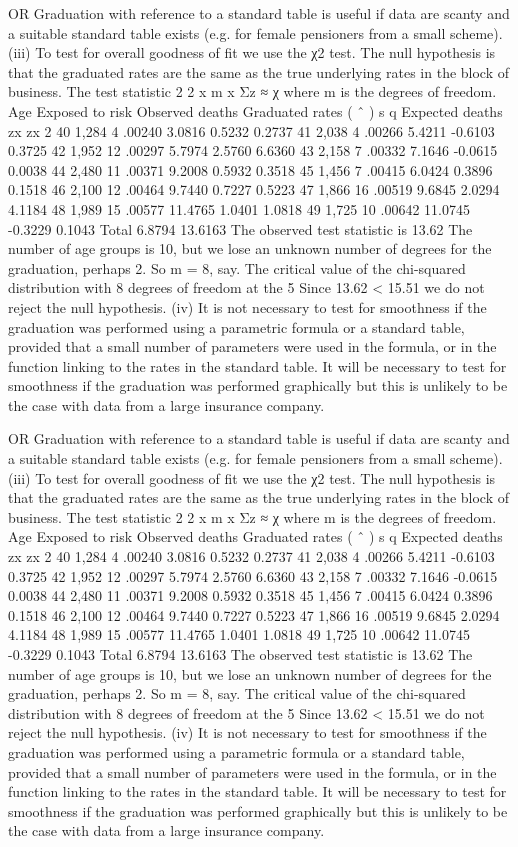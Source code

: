 \documentclass[a4paper,12pt]{article}
\begin{document}
OR
Graduation with reference to a standard table is useful if data are scanty and a
suitable standard table exists (e.g. for female pensioners from a small scheme).
(iii) To test for overall goodness of fit we use the χ2 test.
The null hypothesis is that the graduated rates are the same as the true underlying
rates in the block of business.
The test statistic 2 2
x m
x
Σz ≈ χ where m is the degrees of freedom.
Age Exposed
to risk
Observed
deaths
Graduated
rates ( ˆ ) s q
Expected
deaths
zx zx
2
40 1,284 4 .00240 3.0816 0.5232 0.2737
41 2,038 4 .00266 5.4211 -0.6103 0.3725
42 1,952 12 .00297 5.7974 2.5760 6.6360
43 2,158 7 .00332 7.1646 -0.0615 0.0038
44 2,480 11 .00371 9.2008 0.5932 0.3518
45 1,456 7 .00415 6.0424 0.3896 0.1518
46 2,100 12 .00464 9.7440 0.7227 0.5223
47 1,866 16 .00519 9.6845 2.0294 4.1184
48 1,989 15 .00577 11.4765 1.0401 1.0818
49 1,725 10 .00642 11.0745 -0.3229 0.1043
Total 6.8794 13.6163
The observed test statistic is 13.62
The number of age groups is 10, but we lose an unknown number of degrees for the
graduation, perhaps 2. So m = 8, say.
The critical value of the chi-squared distribution with 8 degrees of
freedom at the 5%
Since 13.62 < 15.51
we do not reject the null hypothesis.
(iv) It is not necessary to test for smoothness if the graduation was performed using a
parametric formula or a standard table, provided that a small number of parameters
were used in the formula, or in the function linking to the rates in the standard table.
It will be necessary to test for smoothness if the graduation was performed graphically
but this is unlikely to be the case with data from a large insurance company.

OR
Graduation with reference to a standard table is useful if data are scanty and a
suitable standard table exists (e.g. for female pensioners from a small scheme).
(iii) To test for overall goodness of fit we use the χ2 test.
The null hypothesis is that the graduated rates are the same as the true underlying
rates in the block of business.
The test statistic 2 2
x m
x
Σz ≈ χ where m is the degrees of freedom.
Age Exposed
to risk
Observed
deaths
Graduated
rates ( ˆ ) s q
Expected
deaths
zx zx
2
40 1,284 4 .00240 3.0816 0.5232 0.2737
41 2,038 4 .00266 5.4211 -0.6103 0.3725
42 1,952 12 .00297 5.7974 2.5760 6.6360
43 2,158 7 .00332 7.1646 -0.0615 0.0038
44 2,480 11 .00371 9.2008 0.5932 0.3518
45 1,456 7 .00415 6.0424 0.3896 0.1518
46 2,100 12 .00464 9.7440 0.7227 0.5223
47 1,866 16 .00519 9.6845 2.0294 4.1184
48 1,989 15 .00577 11.4765 1.0401 1.0818
49 1,725 10 .00642 11.0745 -0.3229 0.1043
Total 6.8794 13.6163
The observed test statistic is 13.62
The number of age groups is 10, but we lose an unknown number of degrees for the
graduation, perhaps 2. So m = 8, say.
The critical value of the chi-squared distribution with 8 degrees of
freedom at the 5%
Since 13.62 < 15.51
we do not reject the null hypothesis.
(iv) It is not necessary to test for smoothness if the graduation was performed using a
parametric formula or a standard table, provided that a small number of parameters
were used in the formula, or in the function linking to the rates in the standard table.
It will be necessary to test for smoothness if the graduation was performed graphically
but this is unlikely to be the case with data from a large insurance company.
\end{document}
